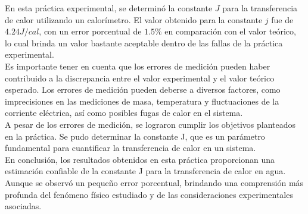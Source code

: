 \documentclass[10pt]{article}
\begin{document}
\begin{multicols*}{2}
En esta práctica experimental, se determinó la constante $J$ para la transferencia de calor utilizando un calorímetro. El valor obtenido para la constante $j$ fue de $4.24 J/cal$, con un error porcentual de $1.5\%$ en comparación con el valor teórico, lo cual brinda un valor bastante aceptable dentro de las fallas de la práctica experimental.\\

Es importante tener en cuenta que los errores de medición pueden haber contribuido a la discrepancia entre el valor experimental y el valor teórico esperado. Los errores de medición pueden deberse a diversos factores, como imprecisiones en las mediciones de masa, temperatura y fluctuaciones de la corriente eléctrica, así como posibles fugas de calor en el sistema.\\

A pesar de los errores de medición, se lograron cumplir los objetivos planteados en la práctica. Se pudo determinar la constante J, que es un parámetro fundamental para cuantificar la transferencia de calor en un sistema.\\

En conclusión, los resultados obtenidos en esta práctica proporcionan una estimación confiable de la constante J para la transferencia de calor en agua. Aunque se observó un pequeño error porcentual, brindando una comprensión más profunda del fenómeno físico estudiado y de las consideraciones experimentales asociadas.

\nocite{giancoli}
\nocite{montiel2015física}
\nocite{termal}
\nocite{ExperimentoJoule}



\end{multicols*}
\end{document}
